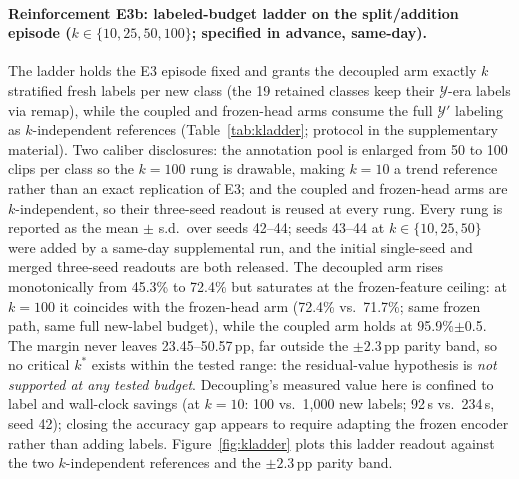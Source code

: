 \paragraph{Reinforcement E3b: labeled-budget ladder on the split/addition episode ($k\in\{10,25,50,100\}$; specified in advance, same-day).}
The ladder holds the E3 episode fixed and grants the decoupled arm exactly $k$ stratified fresh labels per new class (the 19 retained classes keep their $\mathcal{Y}$-era labels via remap), while the coupled and frozen-head arms consume the full $\mathcal{Y}'$ labeling as $k$-independent references (Table~\ref{tab:kladder}; protocol in the supplementary material). Two caliber disclosures: the annotation pool is enlarged from 50 to 100 clips per class so the $k{=}100$ rung is drawable, making $k{=}10$ a trend reference rather than an exact replication of E3; and the coupled and frozen-head arms are $k$-independent, so their three-seed readout is reused at every rung. Every rung is reported as the mean $\pm$ s.d.\ over seeds 42--44; seeds 43--44 at $k\in\{10,25,50\}$ were added by a same-day supplemental run, and the initial single-seed and merged three-seed readouts are both released. The decoupled arm rises monotonically from 45.3\% to 72.4\% but saturates at the frozen-feature ceiling: at $k{=}100$ it coincides with the frozen-head arm (72.4\% vs.\ 71.7\%; same frozen path, same full new-label budget), while the coupled arm holds at 95.9\%$\pm$0.5. The margin never leaves 23.45--50.57\,pp, far outside the $\pm2.3$\,pp parity band, so no critical $k^{\ast}$ exists within the tested range: the residual-value hypothesis is \emph{not supported at any tested budget}. Decoupling's measured value here is confined to label and wall-clock savings (at $k{=}10$: 100 vs.\ 1{,}000 new labels; 92\,s vs.\ 234\,s, seed 42); closing the accuracy gap appears to require adapting the frozen encoder rather than adding labels. Figure~\ref{fig:kladder} plots this ladder readout against the two $k$-independent references and the $\pm2.3$\,pp parity band.

